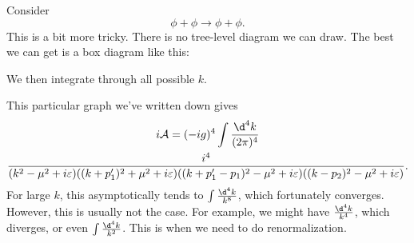 \documentclass[a4paper]{article}
\begin{document}
\begin{eg}
  Consider
  \[
    \phi + \phi \to \phi + \phi.
  \]
  This is a bit more tricky. There is no tree-level diagram we can draw. The best we can get is a box diagram like this:
  \begin{center}
  \end{center}
  We then integrate through all possible $k$.

  This particular graph we've written down gives
  \begin{multline*}
    i\mathcal{A} = (-ig)^4 \int \frac{\d^4 k}{(2\pi)^4}\\\frac{i^4}{(k^2 - \mu^2 + i\varepsilon)((k + p_1')^2 + \mu^2 + i\varepsilon)((k + p_1' - p_1)^2 - \mu^2 + i \varepsilon)((k - p_2)^2 - \mu^2 + i \varepsilon)}.
  \end{multline*}
  For large $k$, this asymptotically tends to $\int \frac{\d^4 k}{k^8}$, which fortunately converges. However, this is usually not the case. For example, we might have $\frac{\d^4k}{k^4}$, which diverges, or even $\int \frac{\d^4 k}{k^2}$. This is when we need to do renormalization.
\end{eg}
\printindex
\end{document}
